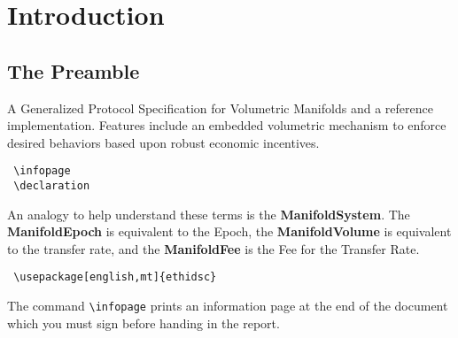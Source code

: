 \chapter{Introduction}\label{sec:introduction}


\section{The Preamble}\label{sec:preamble}
A Generalized Protocol Specification for Volumetric Manifolds and a reference implementation. Features include an embedded  volumetric mechanism to enforce desired behaviors based upon robust economic incentives.
\begin{verbatim}
 \infopage
 \declaration
 \end{verbatim}

An analogy to help understand these terms is the \textbf{ManifoldSystem}. The \textbf{ManifoldEpoch} is equivalent to the Epoch, the \textbf{ManifoldVolume} is equivalent to the transfer rate, and the \textbf{ManifoldFee} is the Fee for the Transfer Rate. 


\begin{verbatim}
 \usepackage[english,mt]{ethidsc}
\end{verbatim}
The command \texttt{\textbackslash infopage} prints an information page at the end of the document which you must sign before handing in the report.


